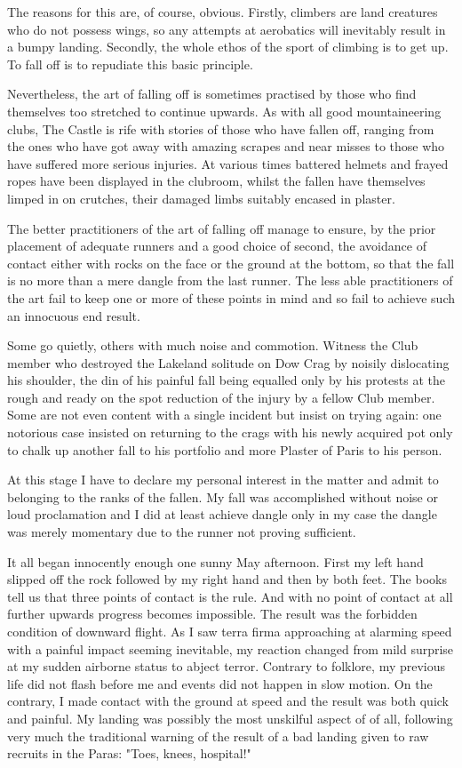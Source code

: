 \documentclass[a5paper,openany,font 10pt]{scrbook}
\begin{document}
The reasons for this are, of course, obvious. Firstly,
climbers are land creatures who do not possess wings, so any
attempts at aerobatics will inevitably result in a bumpy landing.
Secondly, the whole ethos of the sport of climbing is to get up.
To fall off is to repudiate this basic principle.

Nevertheless, the art of falling off is sometimes practised
by those who find themselves too stretched to continue upwards.
As with all good mountaineering clubs, The Castle is rife with
stories of those who have fallen off, ranging from the ones who
have got away with amazing scrapes and near misses to those who
have suffered more serious injuries. At various times battered
helmets and frayed ropes have been displayed in the clubroom,
whilst the fallen have themselves limped in on crutches, their
damaged limbs suitably encased in plaster.

The better practitioners of the art of falling off manage to
ensure, by the prior placement of adequate runners and a good
choice of second, the avoidance of contact either with rocks on
the face or the ground at the bottom, so that the fall is no more
than a mere dangle from the last runner. The less able
practitioners of the art fail to keep one or more of these points
in mind and so fail to achieve such an innocuous end result.

Some go quietly, others with much noise and commotion.
Witness the Club member who destroyed the Lakeland solitude on
Dow Crag by noisily dislocating his shoulder, the din of his
painful fall being equalled only by his protests at the rough and
ready on the spot reduction of the injury by a fellow Club
member. Some are not even content with a single incident but
insist on trying again: one notorious case insisted on returning
to the crags with his newly acquired pot only to chalk up another
fall to his portfolio and more Plaster of Paris to his person.

At this stage I have to declare my personal interest in the
matter and admit to belonging to the ranks of the fallen. My fall
was accomplished without noise or loud proclamation and I did at
least achieve dangle   only in my case the dangle was merely
momentary due to the runner not proving sufficient.

It all began innocently enough one sunny May afternoon.
First my left hand slipped off the rock followed by my right hand
and then by both feet. The books tell us that three points of
contact is the rule. And with no point of contact at all further
upwards progress becomes impossible. The result was the forbidden
condition of downward flight. As I saw terra firma approaching at
alarming speed with a painful impact seeming inevitable, my
reaction changed from mild surprise at my sudden airborne status
to abject terror. Contrary to folklore, my previous life did not
flash before me and events did not happen in slow motion. On the
contrary, I made contact with the ground at speed and the result
was both quick and painful. My landing was possibly the most
unskilful aspect of of all, following very much the traditional
warning of the result of a bad landing given to raw recruits in
the Paras: "Toes, knees, hospital!"
\end{document}

